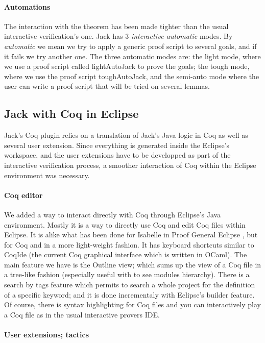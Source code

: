\paragraph{Automations}
The interaction with the theorem has been made tighter than the usual 
interactive verification's one.
Jack has 3 {\it interactive-automatic} modes. 
By {\it automatic} we mean we 
try to apply a generic proof script to several goals, 
and if it fails we try another one. 
The three automatic modes are: the light mode, where we use a proof script
called lightAutoJack to prove the goals; 
the tough mode, where we use the proof script toughAutoJack, 
and the semi-auto mode where the user can write a proof script that will
be tried on several lemmas.



\subsection{Jack with Coq in Eclipse}
Jack's Coq plugin relies on a translation of Jack's Java logic in
Coq as well as several user extension. Since everything is generated
inside the Eclipse's workspace, and the user extensions have to be 
developped as part of the interactive verification process,
 a smoother interaction of Coq within
the Eclipse environment was necessary.

\paragraph{Coq editor}
We added a way to interact directly with Coq through Eclipse's Java 
environment. Mostly it is a way to directly use Coq and edit Coq files within
Eclipse. It is alike what has been done for Isabelle in Proof General Eclipse 
\cite{WintersteinAL05}, but for Coq and in a more light-weight fashion.
It has keyboard shortcuts similar to CoqIde (the current Coq graphical
interface which is written in OCaml). 
The main feature we have is the Outline view; 
which sums up the view of a Coq file in a tree-like fashion (especially useful
with to see modules hierarchy). There is a search by tags feature which
permits to search a whole project for the definition of a specific keyword; and
it is done incrementaly with Eclipse's builder feature. Of course, there is 
syntax highlighting for Coq files and you can interactively play a Coq file
as in the usual interactive provers IDE.


\paragraph{User extensions; tactics}

